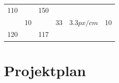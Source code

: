 \begin{appendix}
\begin{table}[h]
\begin{center}
\begin{tabular}[]{| l | l | l | l | l | l |}
                    110     &            & 150   &                &              & \multirow{3}{1cm}{10} \\
                            & 10         &       & 33             & $3.3 px/cm$  & \\
                    \hline
                    120     &            & 117   &                &              & \\
                    \hline

                \end{tabular}
            \end{center}
        \end{table}

    \chapter{Projektplan}

    
        \label{apx:projektplan}


\end{appendix}
